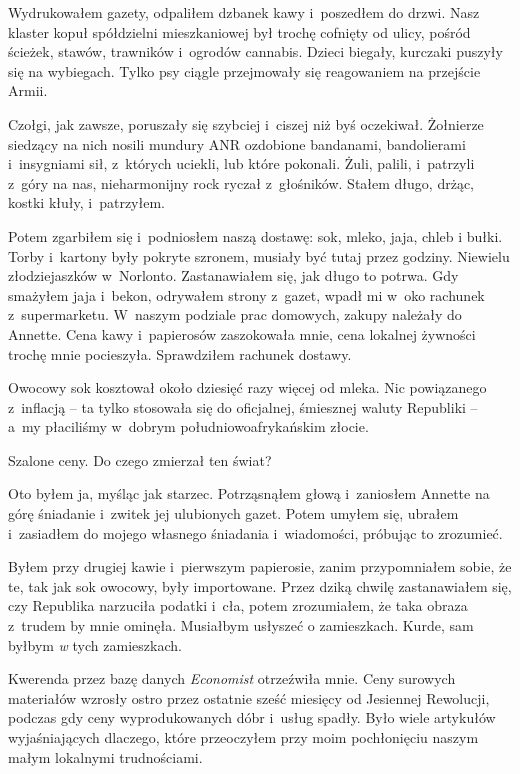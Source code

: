 \documentclass[oneside,polish,11pt,sfheadings]{mwbk}
\begin{document}
Wydrukowałem gazety, odpaliłem dzbanek kawy i~poszedłem do drzwi. Nasz
klaster kopuł spółdzielni mieszkaniowej był trochę cofnięty od ulicy,
pośród ścieżek, stawów, trawników i~ogrodów cannabis. Dzieci biegały,
kurczaki puszyły się na wybiegach. Tylko psy ciągle przejmowały się
reagowaniem na przejście Armii.

Czołgi, jak zawsze, poruszały się szybciej i~ciszej niż byś oczekiwał.
Żołnierze siedzący na nich nosili mundury ANR ozdobione bandanami,
bandolierami i~insygniami sił, z~których uciekli, lub które pokonali.
Żuli, palili, i~patrzyli z~góry na nas, nieharmonijny rock ryczał z~głośników. Stałem długo, drżąc, kostki kłuły, i~patrzyłem.

Potem zgarbiłem się i~podniosłem naszą dostawę: sok, mleko, jaja, chleb
i bułki. Torby i~kartony były pokryte szronem, musiały być tutaj przez
godziny. Niewielu złodziejaszków w~Norlonto. Zastanawiałem się, jak
długo to potrwa. Gdy smażyłem jaja i~bekon, odrywałem strony z~gazet,
wpadł mi w~oko rachunek z~supermarketu. W~naszym podziale prac domowych,
zakupy należały do Annette. Cena kawy i~papierosów zaszokowała mnie,
cena lokalnej żywności trochę mnie pocieszyła. Sprawdziłem rachunek
dostawy.

Owocowy sok kosztował około dziesięć razy więcej od mleka. Nic
powiązanego z~inflacją -- ta tylko stosowała się do oficjalnej, śmiesznej
waluty Republiki -- a~my płaciliśmy w~dobrym południowoafrykańskim
złocie.

Szalone ceny. Do czego zmierzał ten świat?

Oto byłem ja, myśląc jak starzec. Potrząsnąłem głową i~zaniosłem Annette
na górę śniadanie i~zwitek jej ulubionych gazet. Potem umyłem się,
ubrałem i~zasiadłem do mojego własnego śniadania i~wiadomości, próbując
to zrozumieć.

Byłem przy drugiej kawie i~pierwszym papierosie, zanim przypomniałem
sobie, że te, tak jak sok owocowy, były importowane. Przez dziką chwilę
zastanawiałem się, czy Republika narzuciła podatki i~cła, potem
zrozumiałem, że taka obraza z~trudem by mnie ominęła. Musiałbym usłyszeć
o zamieszkach. Kurde, sam byłbym \emph{w} tych zamieszkach.

Kwerenda przez bazę danych \emph{Economist} otrzeźwiła mnie. Ceny
surowych materiałów wzrosły ostro przez ostatnie sześć miesięcy od
Jesiennej Rewolucji, podczas gdy ceny wyprodukowanych dóbr i~usług
spadły. Było wiele artykułów wyjaśniających dlaczego, które przeoczyłem
przy moim pochłonięciu naszym małym lokalnymi trudnościami.
\end{document}
